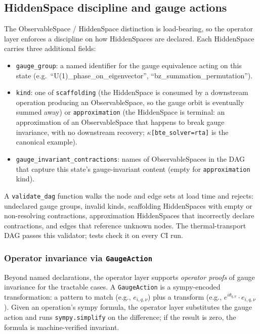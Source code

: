 \documentclass[11pt,a4paper]{article}
\begin{document}
\subsection{HiddenSpace discipline and gauge actions}
\label{ssec:gauge-discipline}

The ObservableSpace / HiddenSpace distinction is load-bearing, so the operator layer
enforces a discipline on how HiddenSpaces are declared. Each HiddenSpace
carries three additional fields:

\begin{itemize}[leftmargin=2em, itemsep=0.2em]
  \item \texttt{gauge\_group}: a named identifier for the gauge equivalence
        acting on this state (e.g.\ ``U(1)\_phase\_on\_eigenvector'',
        ``bz\_summation\_permutation'').
  \item \texttt{kind}: one of \texttt{scaffolding} (the HiddenSpace is
        consumed by a downstream operation producing an ObservableSpace, so the
        gauge orbit is eventually summed away) or \texttt{approximation}
        (the HiddenSpace is terminal: an approximation of an ObservableSpace
        that happens to break gauge invariance, with no downstream recovery;
        $\kappa$\texttt{[bte\_solver=rta]} is the canonical example).
  \item \texttt{gauge\_invariant\_contractions}: names of ObservableSpaces in the
        DAG that capture this state's gauge-invariant content (empty for
        \texttt{approximation} kind).
\end{itemize}

A \texttt{validate\_dag} function walks the node and edge sets at
load time and rejects: undeclared gauge groups, invalid kinds, scaffolding
HiddenSpaces with empty or non-resolving contractions, approximation
HiddenSpaces that incorrectly declare contractions, and edges that
reference unknown nodes. The thermal-transport DAG passes this
validator; tests check it on every CI run.

\subsubsection*{Operator invariance via \texttt{GaugeAction}}

Beyond named declarations, the operator layer supports \emph{operator proofs}
of gauge invariance for the tractable cases. A \texttt{GaugeAction} is a
sympy-encoded transformation: a pattern to match (e.g., $e_{i, q, \nu}$)
plus a transform (e.g., $e^{i\theta_{q,\nu}} \cdot e_{i, q, \nu}$). Given
an operation's sympy formula, the operator layer substitutes the gauge action
and runs \texttt{sympy.simplify} on the difference; if the result is zero,
the formula is machine-verified invariant.
\end{document}
